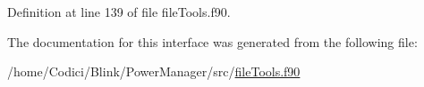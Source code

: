 Definition at line 139 of file file\-Tools.\-f90.



The documentation for this interface was generated from the following file\-:\begin{DoxyCompactItemize}
\item 
/home/\-Codici/\-Blink/\-Power\-Manager/src/\hyperlink{file_tools_8f90}{file\-Tools.\-f90}\end{DoxyCompactItemize}
